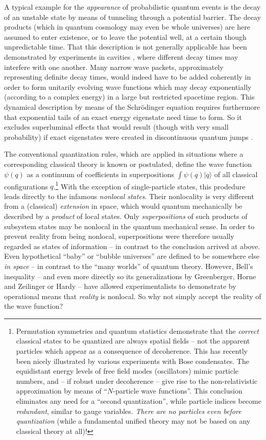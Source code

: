 A typical example for the {\it appearance} of
probabilistic quantum events is the decay of an unstable state by
means of tunneling through a potential barrier. The decay products
(which in quantum cosmology may even be whole universes) are here
assumed to enter existence, or to leave the potential well, at a
certain though unpredictable time. That this description is not
generally applicable has been demonstrated by experiments in cavities
\cite{decay}, where different decay times may interfere with one
another. Many narrow wave packets, approximately representing definite
decay times, would indeed have to be added coherently in order to form
unitarily evolving wave functions which may decay
exponentially (according to
a complex energy) in a large but restricted spacetime region.
This dynamical description by means of the Schr\"odinger equation
requires furthermore that exponential tails of an exact energy
eigenstate need time to form. So it excludes superluminal effects that
would result (though with very small probability) if exact eigenstates
were created in discontinuous quantum jumps
\cite{Hegerfeld}.

The conventional quantization rules, which are applied in
situations where a corresponding classical theory is known or
postulated, define the wave function $\psi(q)$ as a continuum of
coefficients in superpositions $\int\psi(q)|q \rangle$ of all classical
configurations $q$.\footnote{ Permutation symmetries and quantum
statistics demonstrate that the {\it correct} classical states to be
quantized are always spatial fields -- not the apparent
particles which appear as a consequence of decoherence. This has
recently been nicely illustrated by various experiments with Bose
condensates. The equidistant energy levels of free
field modes (oscillators) mimic particle numbers, and -- if robust
under decoherence -- give rise to the non-relativistic approximation by
means of ``$N$-particle wave functions''. This conclusion eliminates
any need for a ``second quantization'', while particle indices become
{\it redundant}, similar to gauge variables. {\it There are no
particles even before quantization} (while a fundamental unified
theory may not be based on any classical theory at all)!} With the
exception of single-particle states, this prodedure leads directly to
the infamous {\it nonlocal states}. Their nonlocality is very
different from a (classical) {\it extension} in space, which would
quantum mechanically be described by a {\it product} of local states.
Only {\it superpositions} of such products of subsystem states may be
nonlocal in the quantum mechanical sense.  In order to prevent reality
from being nonlocal, superpositions were therefore usually regarded as
states of information -- in contrast to the conclusion arrived at
above. Even hypothetical ``baby'' or ``bubble universes'' are defined
to be somewhere else {\it in space} -- in contrast to the ``many
worlds'' of quantum theory. However, Bell's inequality
  -- and
even more directly so its generalizations by Greenberger, Horne and
Zeilinger \cite{GHZ} or Hardy \cite{Hardy} -- have allowed
experimentalists to demonstrate by operational means that {\it reality}
is nonlocal. So why not simply accept the reality of the wave
function?


